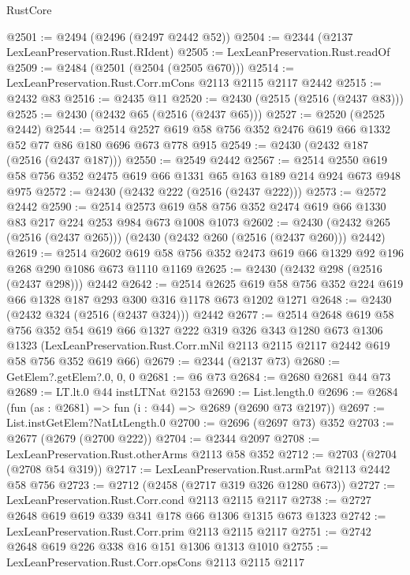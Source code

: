 \begin{lexlean}{RustCore}
\begin{coremodule}
@2501 := @2494 (@2496 (@2497 @2442 @52))
@2504 := @2344 (@2137 LexLeanPreservation.Rust.RIdent)
@2505 := LexLeanPreservation.Rust.readOf
@2509 := @2484 (@2501 (@2504 (@2505 @670)))
@2514 := LexLeanPreservation.Rust.Corr.mCons @2113 @2115 @2117 @2442
@2515 := @2432 @83
@2516 := @2435 @11
@2520 := @2430 (@2515 (@2516 (@2437 @83)))
@2525 := @2430 (@2432 @65 (@2516 (@2437 @65)))
@2527 := @2520 (@2525 @2442)
@2544 := @2514 @2527 @619 @58 @756 @352 @2476 @619 @66 @1332 @52 @77 @86 @180 @696 @673 @778 @915
@2549 := @2430 (@2432 @187 (@2516 (@2437 @187)))
@2550 := @2549 @2442
@2567 := @2514 @2550 @619 @58 @756 @352 @2475 @619 @66 @1331 @65 @163 @189 @214 @924 @673 @948 @975
@2572 := @2430 (@2432 @222 (@2516 (@2437 @222)))
@2573 := @2572 @2442
@2590 := @2514
    @2573
    @619
    @58
    @756
    @352
    @2474
    @619
    @66
    @1330
    @83
    @217
    @224
    @253
    @984
    @673
    @1008
    @1073
@2602 := @2430 (@2432 @265 (@2516 (@2437 @265))) (@2430 (@2432 @260 (@2516 (@2437 @260))) @2442)
@2619 := @2514
    @2602
    @619
    @58
    @756
    @352
    @2473
    @619
    @66
    @1329
    @92
    @196
    @268
    @290
    @1086
    @673
    @1110
    @1169
@2625 := @2430 (@2432 @298 (@2516 (@2437 @298))) @2442
@2642 := @2514
    @2625
    @619
    @58
    @756
    @352
    @224
    @619
    @66
    @1328
    @187
    @293
    @300
    @316
    @1178
    @673
    @1202
    @1271
@2648 := @2430 (@2432 @324 (@2516 (@2437 @324))) @2442
@2677 := @2514
    @2648
    @619
    @58
    @756
    @352
    @54
    @619
    @66
    @1327
    @222
    @319
    @326
    @343
    @1280
    @673
    @1306
    @1323
    (LexLeanPreservation.Rust.Corr.mNil @2113 @2115 @2117 @2442 @619 @58 @756 @352 @619 @66)
@2679 := @2344 (@2137 @73)
@2680 := GetElem?.getElem?.{0, 0, 0}
@2681 := @6 @73
@2684 := @2680 @2681 @44 @73
@2689 := LT.lt.{0} @44 instLTNat @2153
@2690 := List.length.{0}
@2696 := @2684 (fun (as : @2681) => fun (i : @44) => @2689 (@2690 @73 @2197))
@2697 := List.instGetElem?NatLtLength.{0}
@2700 := @2696 (@2697 @73) @352
@2703 := @2677 (@2679 (@2700 @222))
@2704 := @2344 @2097
@2708 := LexLeanPreservation.Rust.otherArms @2113 @58 @352
@2712 := @2703 (@2704 (@2708 @54 @319))
@2717 := LexLeanPreservation.Rust.armPat @2113 @2442 @58 @756
@2723 := @2712 (@2458 (@2717 @319 @326 @1280 @673))
@2727 := LexLeanPreservation.Rust.Corr.cond @2113 @2115 @2117
@2738 := @2727 @2648 @619 @619 @339 @341 @178 @66 @1306 @1315 @673 @1323
@2742 := LexLeanPreservation.Rust.Corr.prim @2113 @2115 @2117
@2751 := @2742 @2648 @619 @226 @338 @16 @151 @1306 @1313 @1010
@2755 := LexLeanPreservation.Rust.Corr.opsCons @2113 @2115 @2117

\end{coremodule}
\end{lexlean}
